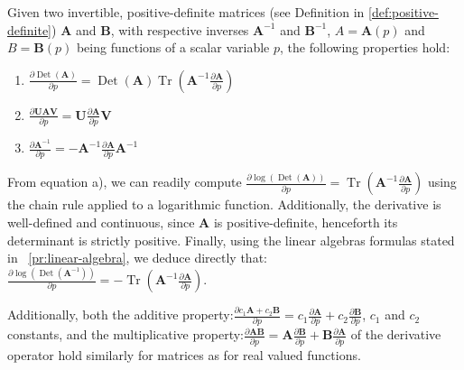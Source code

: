 \documentclass[long, final]{jobim}
\DeclareMathOperator*{\Tr}{Tr}
\DeclareMathOperator*{\DET}{Det}
\begin{document}
\begin{property}
\label{pr:matrix-calculus-first-order}
Given two invertible, positive-definite matrices (see Definition in \ref{def:positive-definite}) $\boldsymbol{A}$ and $\boldsymbol{B}$, with respective inverses $\boldsymbol{A}^{-1}$ and $\boldsymbol{B}^{-1}$, $A=\boldsymbol{A}(p)$ and $B=\boldsymbol{B}(p)$ being functions of a scalar variable $p$, the following properties hold:
\begin{multicols}{3}
\begin{enumerate}[label=(\alph*)]
\item $\frac{\partial \DET(\boldsymbol{A})}{\partial p}=\DET(\boldsymbol{A}) \Tr \left(\boldsymbol{A}^{-1} \frac{\partial \boldsymbol{A}}{\partial p} \right)$
\item $\frac{\partial \boldsymbol{U}\boldsymbol{A}\boldsymbol{V}}{\partial p} = \boldsymbol{U} \frac{\partial\boldsymbol{A}}{\partial p} \boldsymbol{V}$
\item $\frac{\partial \boldsymbol{A}^{-1}}{\partial p} = -\boldsymbol{A}^{-1} \frac{\partial\boldsymbol{A}}{\partial p} \boldsymbol{A}^{-1}$
\end{enumerate}
\end{multicols}
From equation a), we can readily compute $\frac{\partial \log\left(\DET(\boldsymbol{A})\right)}{\partial p}= \Tr \left(\boldsymbol{A}^{-1} \frac{\partial \boldsymbol{A}}{\partial p} \right)$ using the chain rule applied to a logarithmic function. Additionally, the derivative is well-defined and continuous, since $\boldsymbol{A}$ is positive-definite, henceforth its determinant is strictly positive. Finally, using the linear algebras formulas stated in \propertyname~\ref{pr:linear-algebra}, we deduce directly that: $\frac{\partial \log\left(\DET(\boldsymbol{A}^{-1})\right)}{\partial p}=- \Tr \left(\boldsymbol{A}^{-1} \frac{\partial \boldsymbol{A}}{\partial p} \right)$.

Additionally, both the additive property:$\frac{\partial c_1 \boldsymbol{A} + c_2 \boldsymbol{B}}{\partial p}=c_1 \frac{\partial \boldsymbol{A}}{\partial p} + c_2 \frac{\partial \boldsymbol{B}}{\partial p}$, $c_1$ and $c_2$ constants, and the multiplicative property:$\frac{\partial \boldsymbol{A} \boldsymbol{B}}{\partial p}= \boldsymbol{A}\frac{\partial \boldsymbol{B}}{\partial p} + \boldsymbol{B} \frac{\partial \boldsymbol{A}}{\partial p}$ of the derivative operator hold similarly for matrices as for real valued functions.



\end{property}
\end{document}
